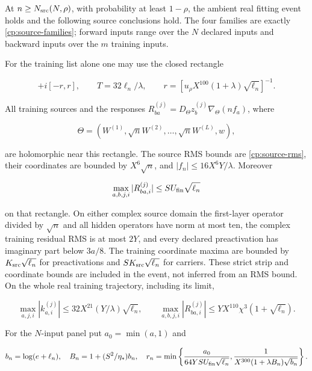 \begin{lemma}
\label{cp:poly:source}

At $n\ge N_{\rm src}(N,\rho)$, with probability at least $1-\rho$,
the ambient real fitting event holds and the following source conclusions
hold. The four families are exactly \eqref{cp:source-families};
forward inputs range over the $N$ declared inputs and backward inputs over
the $m$ training inputs.

For the training list alone one may use the closed rectangle

\begin{equation}
[-r,T+r]+i[-r,r],\qquad
T=32\ell_n/\lambda,\qquad
r=[u_\rho X^{100}(1+\lambda)\sqrt{\ell_n}]^{-1}.
\label{cp:poly:eq:training-radius}
\end{equation}

All training sources and the responses
$R_{ba}^{(j)}=D_\Theta z_b^{(j)}\nabla_\Theta(nf_a)$, where

\[
\Theta=(W^{(1)},\sqrt nW^{(2)},\ldots,\sqrt nW^{(L)},w),
\]

are holomorphic near this rectangle. The source RMS bounds are
\eqref{cp:source-rms}, their coordinates are bounded by
$X^6\sqrt n$, and $|f_n|\le16X^6Y/\lambda$. Moreover

\[
\max_{a,b,j,i}|R_{ba,i}^{(j)}|\le SU_{\rm fin}\sqrt{\ell_n}
\]

on that rectangle. On either complex source domain the first-layer
operator divided by $\sqrt n$ and all hidden operators have norm at most
ten, the complex training residual RMS is at most $2Y$, and every declared
preactivation has imaginary part below $3a/8$. The training coordinate
maxima are bounded by $K_{\rm src}\sqrt{\ell_n}$ for preactivations and
$SK_{\rm src}\sqrt{\ell_n}$ for carriers. These strict strip and
coordinate bounds are included in the event, not inferred from an RMS
bound. On the whole real training trajectory, including its
limit,

\begin{equation}
\max_{a,j,i}|k_{a,i}^{(j)}|\le32X^{21}(Y/\lambda)\sqrt{\ell_n},
\qquad
\max_{a,b,j,i}|R_{ba,i}^{(j)}|
 \le YX^{110}\chi^3(1+\sqrt{\ell_n}).
\label{cp:poly:eq:real-response}
\end{equation}

For the $N$-input panel put $a_0=\min(a,1)$ and

\begin{equation}
b_n=\log(e+\ell_n),\quad B_n=1+(S^2/\eta_*)b_n,\quad
r_n=\min\left\{\frac{a_0}{64YSU_{\rm fin}\sqrt{\ell_n}},
 \frac1{X^{300}(1+\lambda B_n)\sqrt{b_n}}\right\}.
\label{cp:poly:eq:panel-radius}
\end{equation}


\end{lemma}
